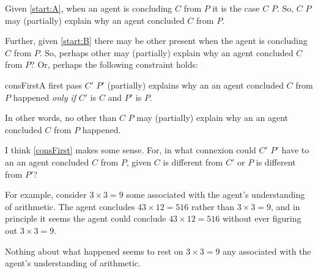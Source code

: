 



\begin{note}
  Given \ref{start:A}, when an agent is concluding \(C\) from \(P\) it is the case \(C\) \fof{} \(P\).
  So, \(C\)  \(P\) may (partially) explain why an agent concluded \(C\) from \(P\).

  Further, given \ref{start:B} there may be other \fingfr{} present when the agent is concluding \(C\) from \(P\).
  So, perhaps other  may (partially) explain why an agent concluded \(C\) from \(P\)?
  Or, perhaps the following constraint holds:

  \begin{constraint}{consFirst}{A first pass}
    \(C'\) \fingfr{} \(P'\) (partially) explains why an  an agent concluded \(C\) from \(P\) happened \emph{only if} \(C'\) is \(C\) and \(P'\) is \(P\).
  \end{constraint}

  \noindent%
  In other words, no \fingfr{} other than \(C\) \fingf{} \(P\) may (partially) explain why an  an agent concluded \(C\) from \(P\) happened.
\end{note}


\begin{note}
  I think \autoref{consFirst} makes some sense.
  For, in what connexion could \(C'\) \fingfr{} \(P'\) have to an  an agent concluded \(C\) from \(P\), given \(C\) is different from \(C'\) or \(P\) is different from \(P'\)?

  For example, consider \(3 \times 3 = 9\) \fingf{} some \pool{} associated with the agent's understanding of arithmetic.
  The agent concludes \(43 \times 12 = 516\) rather than \(3 \times 3 = 9\), and in principle it seems the agent could conclude \(43 \times 12 = 516\) without ever figuring out \(3 \times 3 = 9\).

  Nothing about what happened seems to rest on \(3 \times 3 = 9\) \fingf{} any \pool{} associated with the agent's understanding of arithmetic.
\end{note}


